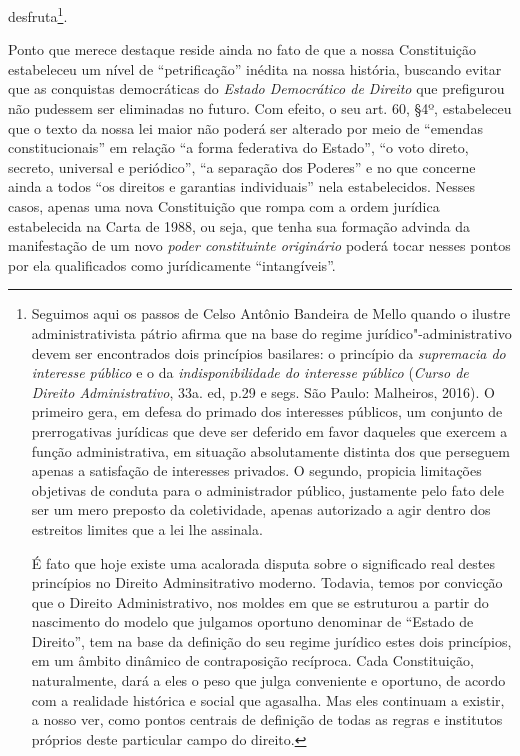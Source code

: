 desfruta\footnote{Seguimos aqui os passos de Celso Antônio Bandeira de
  Mello quando o ilustre administrativista pátrio afirma que na base do
  regime jurídico"-administrativo devem ser encontrados dois princípios
  basilares: o princípio da \emph{supremacia do interesse público} e o
  da \emph{indisponibilidade do interesse público} (\emph{Curso de
  Direito Administrativo}, 33a. ed, p.29 e segs. São Paulo: Malheiros,
  2016). O primeiro gera, em defesa do primado dos interesses públicos,
  um conjunto de prerrogativas jurídicas que deve ser deferido em favor
  daqueles que exercem a função administrativa, em situação
  absolutamente distinta dos que perseguem apenas a satisfação de
  interesses privados. O segundo, propicia limitações objetivas de
  conduta para o administrador público, justamente pelo fato dele ser um
  mero preposto da coletividade, apenas autorizado a agir dentro dos
  estreitos limites que a lei lhe assinala.

  É fato que hoje existe uma acalorada disputa sobre o significado real
  destes princípios no Direito Adminsitrativo moderno. Todavia, temos
  por convicção que o Direito Administrativo, nos moldes em que se
  estruturou a partir do nascimento do modelo que julgamos oportuno
  denominar de ``Estado de Direito'', tem na base da definição do
  seu regime jurídico estes dois princípios, em um âmbito dinâmico de
  contraposição recíproca. Cada Constituição, naturalmente, dará a eles
  o peso que julga conveniente e oportuno, de acordo com a realidade
  histórica e social que agasalha. Mas eles continuam a existir, a nosso
  ver, como pontos centrais de definição de todas as regras e institutos
  próprios deste particular campo do direito.}.

Ponto que merece destaque reside ainda no fato de que a nossa
Constituição estabeleceu um nível de ``petrificação'' inédita na nossa
história, buscando evitar que as conquistas democráticas do \emph{Estado
Democrático de Direito} que prefigurou não pudessem ser eliminadas no
futuro. Com efeito, o seu art. 60, §4º, estabeleceu que o texto da nossa
lei maior não poderá ser alterado por meio de ``emendas
constitucionais'' em relação ``a forma federativa do Estado'',
``o voto direto, secreto, universal e periódico'', ``a
separação dos Poderes'' e no que concerne ainda a todos ``os
direitos e garantias individuais'' nela estabelecidos. Nesses casos,
apenas uma nova Constituição que rompa com a ordem jurídica estabelecida
na Carta de 1988, ou seja, que tenha sua formação advinda da
manifestação de um novo \emph{poder constituinte originário} poderá
tocar nesses pontos por ela qualificados como jurídicamente
``intangíveis''.

